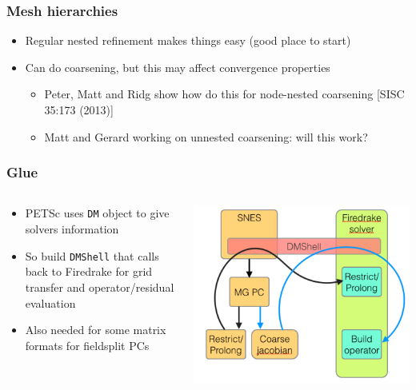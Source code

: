 \documentclass[presentation]{beamer}
\begin{document}
\begin{frame}
  \frametitle{Mesh hierarchies}
  \begin{itemize}[<+->]
  \item Regular nested refinement makes things easy (good place to
    start)
  \item Can do coarsening, but this may affect convergence properties
    \begin{itemize}
    \item Peter, Matt and Ridg show how do this for node-nested
      coarsening [SISC 35:173 (2013)]
    \item Matt and Gerard working on unnested coarsening: will this
      work?
    \end{itemize}
  \end{itemize}
\end{frame}
\begin{frame}[fragile]
  \frametitle{Glue}
  \begin{columns}
    \begin{column}{0.5\textwidth}
      \begin{itemize}
      \item PETSc uses \verb|DM| object to give solvers information
      \item So build \verb|DMShell| that calls back to Firedrake for
        grid transfer and operator/residual evaluation
      \item Also needed for some matrix formats for fieldsplit PCs
      \end{itemize}
    \end{column}
    \begin{column}{0.5\textwidth}
      \centering
      \includegraphics[width=\textwidth]{06-29-FEniCS-multigrid.figures/glue.pdf}
    \end{column}
  \end{columns}
\end{frame}
\end{document}
